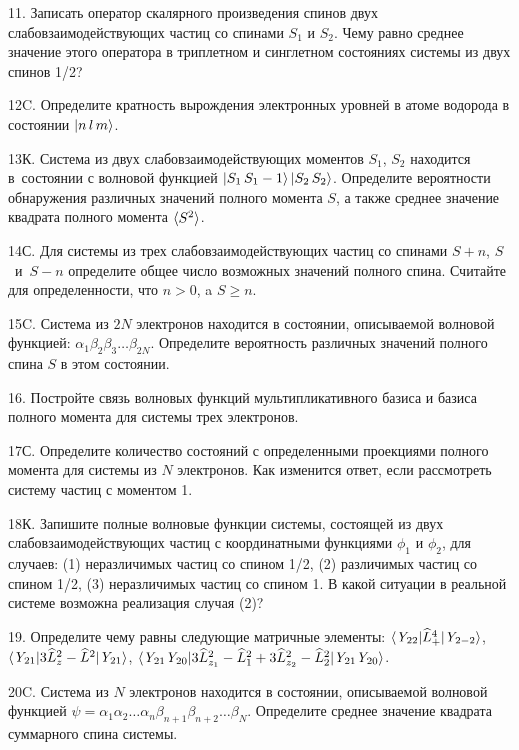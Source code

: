 \par
11. Записать оператор скалярного произведения спинов двух слабовзаимодействующих частиц со спинами $S_1$ и $S_2$. Чему равно среднее значение этого оператора в триплетном и синглетном состояниях системы из двух спинов 1/2?
\par
12C. Определите кратность вырождения электронных уровней в атоме водорода в состоянии $\ket{n\,l\,m} $.
\par
13К. Система из двух слабовзаимодействующих моментов $S_1$, $S_2$ находится в~состоянии с волновой функцией $\ket{S_1\,S_1-1}\ket{S_2\,S_2}$. Определите вероятности обнаружения различных значений полного момента $S$, а также среднее значение квадрата полного момента $\braket{S^2}$.
\par
14С. Для системы из трех слабовзаимодействующих частиц со спинами $S + n$, $S$~и~$S - n$ определите общее число возможных значений полного спина. Считайте для определенности, что $n > 0$, a $S \geq n$.
\par
15C. Система из $2N$ электронов находится в состоянии, описываемой волновой функцией: $\alpha_1\beta_2\beta_3 \ldots \beta_{2N}$. Определите вероятность различных значений полного спина $S$ в этом состоянии.
\par
16. Постройте связь волновых функций мультипликативного базиса и базиса полного момента для системы трех электронов.
\par
17С. Определите количество состояний с определенными проекциями полного момента для системы из $N$ электронов. Как изменится ответ, если рассмотреть систему частиц с моментом 1.
\par
18К. Запишите полные волновые функции системы, состоящей из двух слабовзаимодействующих частиц с координатными функциями $\phi_1$ и $\phi_2$, для случаев: (1) неразличимых частиц со спином 1/2, (2) различимых частиц со спином 1/2, (3) неразличимых частиц со спином 1. В какой ситуации в реальной системе возможна реализация случая (2)?
\par
19. Определите чему равны следующие матричные элементы: $\braket{\textit{Y}_{22}|\widehat L^4_+|\textit{Y}_{2-2}}$, $\braket{\textit{Y}_{21}|3\widehat L_{z}^2- \widehat L^2|\textit{Y}_{21}}$, $\braket{\textit{Y}_{21}\textit{Y}_{20}|3 \widehat L_{z_1}^2- \widehat L_1^2+3 \widehat L_{z_2}^2- \widehat L_2^2|\textit{Y}_{21}\textit{Y}_{20}}$.
\par
20C. Система из $N$ электронов находится в состоянии, описываемой волновой функцией $\psi=\alpha_1\alpha_2 \ldots \alpha_n\beta_{n+1}\beta_{n+2} \ldots \beta_{N}$. Определите среднее значение квадрата суммарного спина системы.
\par
